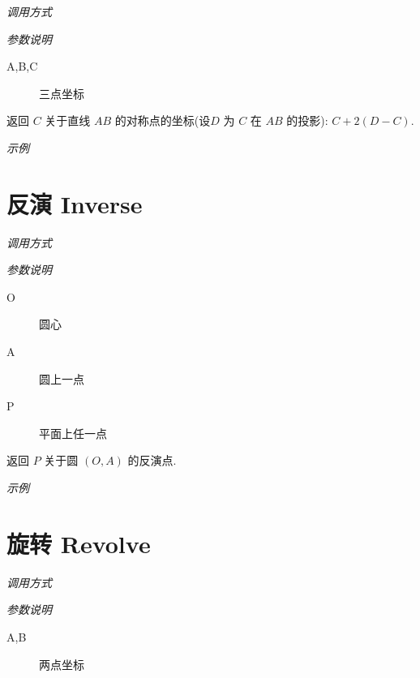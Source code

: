 \emph{调用方式}

\begin{tcolorbox}{}
\end{tcolorbox}

\emph{参数说明}

\begin{description}
  \item[A,B,C] 三点坐标
\end{description}

返回 $C$ 关于直线 $AB$ 的对称点的坐标(设$D$ 为 $C$ 在 $AB$ 的投影): $C+2(D-C)$.

\emph{示例}


\section{反演 Inverse}

\emph{调用方式}

\begin{tcolorbox}{}
\end{tcolorbox}

\emph{参数说明}

\begin{description}
  \item[O] 圆心
  \item[A] 圆上一点
  \item[P] 平面上任一点 
\end{description}

返回 $P$ 关于圆 $(O,A)$ 的反演点.

\emph{示例}


\section{旋转 Revolve}

\emph{调用方式}

\begin{tcolorbox}{}
\end{tcolorbox}

\emph{参数说明}

\begin{description}
  \item[A,B] 两点坐标
\end{description}

